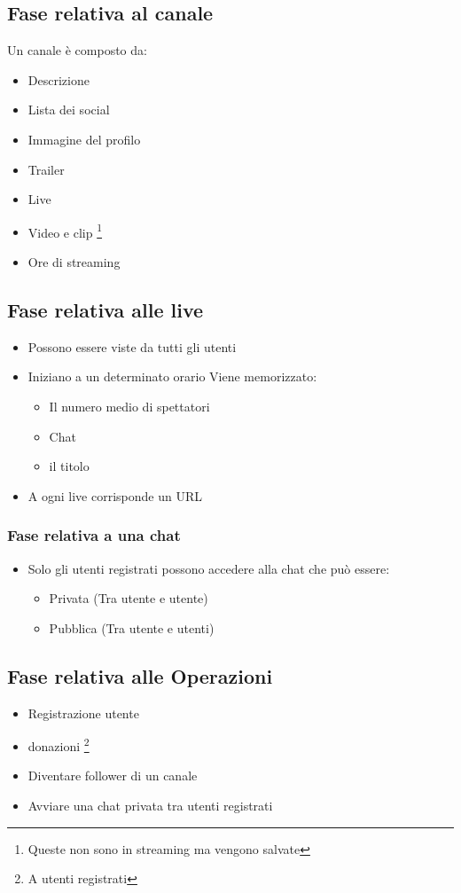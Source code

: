 \subsection{Fase relativa al canale}
Un canale è composto da:
\begin{itemize}
  \item Descrizione
  \item Lista dei social
  \item Immagine del profilo
  \item Trailer 
  \item Live 
  \item Video e clip \footnote{Queste non sono in streaming ma vengono salvate}
  \item Ore di streaming
\end{itemize}
\subsection{Fase relativa alle live}
\begin{itemize}
  \item Possono essere viste da tutti gli utenti
  \item Iniziano a un determinato orario \newline
  Viene memorizzato:
    \begin{itemize}
      \item Il numero medio di spettatori
      \item Chat 
      \item il titolo
    \end{itemize}
    \item A ogni live corrisponde un URL
\end{itemize}
\subsubsection{Fase relativa a una chat}
\begin{itemize}
  \item Solo gli utenti registrati possono accedere alla chat che può essere:
  \begin{itemize}
    \item Privata (Tra utente e utente)
    \item Pubblica (Tra utente e utenti) 
  \end{itemize}
\end{itemize}
\subsection{Fase relativa alle Operazioni}
\begin{itemize}
  \item Registrazione utente
  \item donazioni \footnote{A utenti registrati}
  \item Diventare follower di un canale
  \item Avviare una chat privata tra utenti registrati
\end{itemize}
